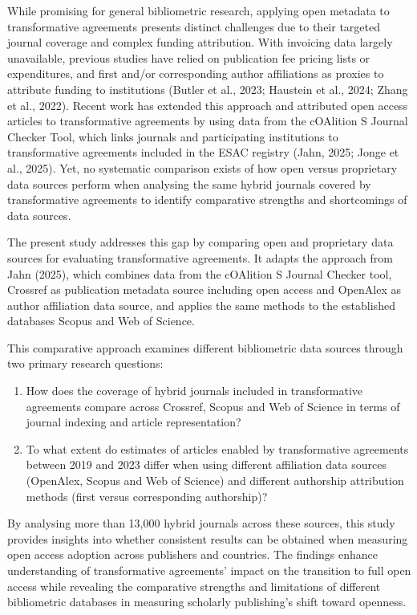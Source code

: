 \documentclass[a4paper,man,floatsintext,longtable,noextraspace,10pt]{apa6}
\begin{document}
While promising for general bibliometric research, applying open
metadata to transformative agreements presents distinct challenges due
to their targeted journal coverage and complex funding attribution. With
invoicing data largely unavailable, previous studies have relied on
publication fee pricing lists or expenditures, and first and/or
corresponding author affiliations as proxies to attribute funding to
institutions (Butler et al., 2023; Haustein et al., 2024; Zhang et al.,
2022). Recent work has extended this approach and attributed open access
articles to transformative agreements by using data from the cOAlition S
Journal Checker Tool, which links journals and participating
institutions to transformative agreements included in the ESAC registry
(Jahn, 2025; Jonge et al., 2025). Yet, no systematic comparison exists
of how open versus proprietary data sources perform when analysing the
same hybrid journals covered by transformative agreements to identify
comparative strengths and shortcomings of data sources.

The present study addresses this gap by comparing open and proprietary
data sources for evaluating transformative agreements. It adapts the
approach from Jahn (2025), which combines data from the cOAlition S
Journal Checker tool, Crossref as publication metadata source including
open access and OpenAlex as author affiliation data source, and applies
the same methods to the established databases Scopus and Web of Science.

This comparative approach examines different bibliometric data sources
through two primary research questions:

\begin{enumerate}
\def\labelenumi{\arabic{enumi}.}
\item
  How does the coverage of hybrid journals included in transformative
  agreements compare across Crossref, Scopus and Web of Science in terms
  of journal indexing and article representation?
\item
  To what extent do estimates of articles enabled by transformative
  agreements between 2019 and 2023 differ when using different
  affiliation data sources (OpenAlex, Scopus and Web of Science) and
  different authorship attribution methods (first versus corresponding
  authorship)?
\end{enumerate}

By analysing more than 13,000 hybrid journals across these sources, this
study provides insights into whether consistent results can be obtained
when measuring open access adoption across publishers and countries. The
findings enhance understanding of transformative agreements' impact on
the transition to full open access while revealing the comparative
strengths and limitations of different bibliometric databases in
measuring scholarly publishing's shift toward openness.
\end{document}
